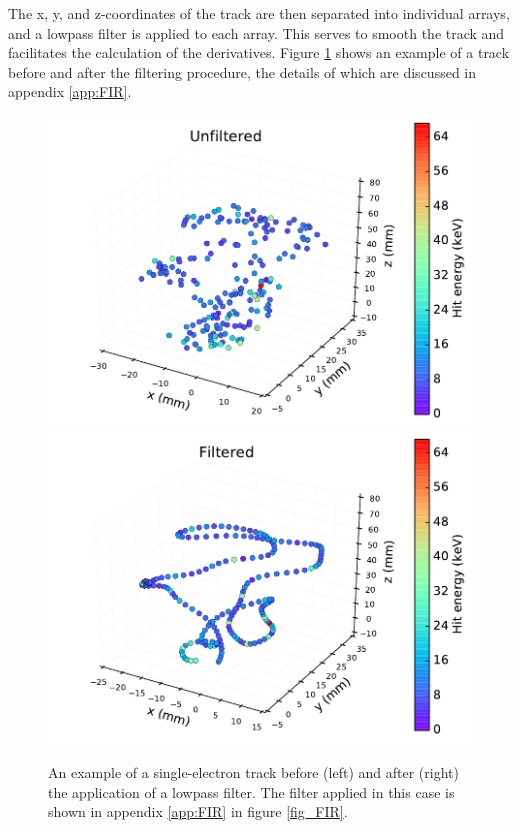 \documentclass{JINST}
\begin{document}
The x, y, and z-coordinates of the track are then separated into individual arrays, and a lowpass 
filter is applied to each array.  This serves to smooth the track and facilitates the calculation of 
the derivatives.  Figure \ref{fig_flt} shows an example of a track before and after the filtering procedure, the
details of which are discussed in appendix \ref{app:FIR}.

\begin{figure}[!htb]
	\centering
	\includegraphics[scale=0.48]{fig/plt_trk_unflt_nmagse2_6.pdf}
	\includegraphics[scale=0.48]{fig/plt_trk_flt_nmagse2_6.pdf}
	\caption{\label{fig_flt}An example of a single-electron track before (left) and after (right) the application of a lowpass filter.  The filter applied in this case is shown in appendix \protect\ref{app:FIR} in figure \protect\ref{fig_FIR}.}
\end{figure}
\end{document}
